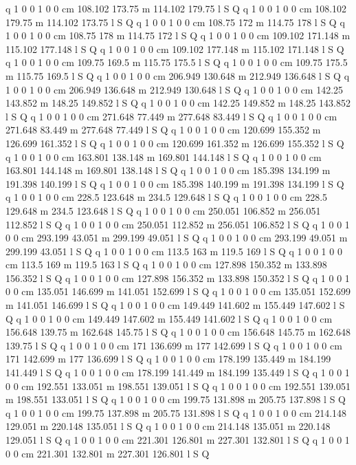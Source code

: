 q 1 0 0 1 0 0 cm
108.102 173.75 m 114.102 179.75 l S Q
q 1 0 0 1 0 0 cm
108.102 179.75 m 114.102 173.75 l S Q
q 1 0 0 1 0 0 cm
108.75 172 m 114.75 178 l S Q
q 1 0 0 1 0 0 cm
108.75 178 m 114.75 172 l S Q
q 1 0 0 1 0 0 cm
109.102 171.148 m 115.102 177.148 l S Q
q 1 0 0 1 0 0 cm
109.102 177.148 m 115.102 171.148 l S Q
q 1 0 0 1 0 0 cm
109.75 169.5 m 115.75 175.5 l S Q
q 1 0 0 1 0 0 cm
109.75 175.5 m 115.75 169.5 l S Q
q 1 0 0 1 0 0 cm
206.949 130.648 m 212.949 136.648 l S Q
q 1 0 0 1 0 0 cm
206.949 136.648 m 212.949 130.648 l S Q
q 1 0 0 1 0 0 cm
142.25 143.852 m 148.25 149.852 l S Q
q 1 0 0 1 0 0 cm
142.25 149.852 m 148.25 143.852 l S Q
q 1 0 0 1 0 0 cm
271.648 77.449 m 277.648 83.449 l S Q
q 1 0 0 1 0 0 cm
271.648 83.449 m 277.648 77.449 l S Q
q 1 0 0 1 0 0 cm
120.699 155.352 m 126.699 161.352 l S Q
q 1 0 0 1 0 0 cm
120.699 161.352 m 126.699 155.352 l S Q
q 1 0 0 1 0 0 cm
163.801 138.148 m 169.801 144.148 l S Q
q 1 0 0 1 0 0 cm
163.801 144.148 m 169.801 138.148 l S Q
q 1 0 0 1 0 0 cm
185.398 134.199 m 191.398 140.199 l S Q
q 1 0 0 1 0 0 cm
185.398 140.199 m 191.398 134.199 l S Q
q 1 0 0 1 0 0 cm
228.5 123.648 m 234.5 129.648 l S Q
q 1 0 0 1 0 0 cm
228.5 129.648 m 234.5 123.648 l S Q
q 1 0 0 1 0 0 cm
250.051 106.852 m 256.051 112.852 l S Q
q 1 0 0 1 0 0 cm
250.051 112.852 m 256.051 106.852 l S Q
q 1 0 0 1 0 0 cm
293.199 43.051 m 299.199 49.051 l S Q
q 1 0 0 1 0 0 cm
293.199 49.051 m 299.199 43.051 l S Q
q 1 0 0 1 0 0 cm
113.5 163 m 119.5 169 l S Q
q 1 0 0 1 0 0 cm
113.5 169 m 119.5 163 l S Q
q 1 0 0 1 0 0 cm
127.898 150.352 m 133.898 156.352 l S Q
q 1 0 0 1 0 0 cm
127.898 156.352 m 133.898 150.352 l S Q
q 1 0 0 1 0 0 cm
135.051 146.699 m 141.051 152.699 l S Q
q 1 0 0 1 0 0 cm
135.051 152.699 m 141.051 146.699 l S Q
q 1 0 0 1 0 0 cm
149.449 141.602 m 155.449 147.602 l S Q
q 1 0 0 1 0 0 cm
149.449 147.602 m 155.449 141.602 l S Q
q 1 0 0 1 0 0 cm
156.648 139.75 m 162.648 145.75 l S Q
q 1 0 0 1 0 0 cm
156.648 145.75 m 162.648 139.75 l S Q
q 1 0 0 1 0 0 cm
171 136.699 m 177 142.699 l S Q
q 1 0 0 1 0 0 cm
171 142.699 m 177 136.699 l S Q
q 1 0 0 1 0 0 cm
178.199 135.449 m 184.199 141.449 l S Q
q 1 0 0 1 0 0 cm
178.199 141.449 m 184.199 135.449 l S Q
q 1 0 0 1 0 0 cm
192.551 133.051 m 198.551 139.051 l S Q
q 1 0 0 1 0 0 cm
192.551 139.051 m 198.551 133.051 l S Q
q 1 0 0 1 0 0 cm
199.75 131.898 m 205.75 137.898 l S Q
q 1 0 0 1 0 0 cm
199.75 137.898 m 205.75 131.898 l S Q
q 1 0 0 1 0 0 cm
214.148 129.051 m 220.148 135.051 l S Q
q 1 0 0 1 0 0 cm
214.148 135.051 m 220.148 129.051 l S Q
q 1 0 0 1 0 0 cm
221.301 126.801 m 227.301 132.801 l S Q
q 1 0 0 1 0 0 cm
221.301 132.801 m 227.301 126.801 l S Q
